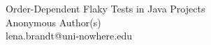 

\begin{center}
{\Large Order-Dependent Flaky Tests in Java Projects}\\[1ex]
Anonymous Author(s)\\
lena.brandt@uni-nowhere.edu
\end{center}

\visibleintro

